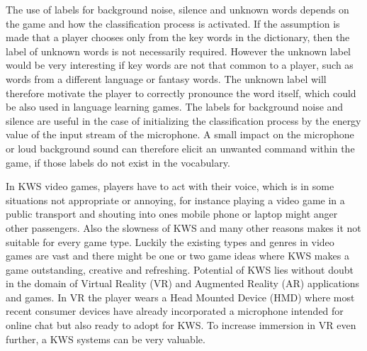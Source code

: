 The use of labels for background noise, silence and unknown words depends on the game and how the classification process is activated.
If the assumption is made that a player chooses only from the key words in the dictionary, then the label of unknown words is not necessarily required.
However the unknown label would be very interesting if key words are not that common to a player, such as words from a different language or fantasy words.
The unknown label will therefore motivate the player to correctly pronounce the word itself, which could be also used in language learning games.
The labels for background noise and silence are useful in the case of initializing the classification process by the energy value of the input stream of the microphone.
A small impact on the microphone or loud background sound can therefore elicit an unwanted command within the game, if those labels do not exist in the vocabulary.

In KWS video games, players have to act with their voice, which is in some situations not appropriate or annoying, for instance playing a video game in a public transport and shouting into ones mobile phone or laptop might anger other passengers.
Also the slowness of KWS and many other reasons makes it not suitable for every game type.
Luckily the existing types and genres in video games are vast and there might be one or two game ideas where KWS makes a game outstanding, creative and refreshing.
Potential of KWS lies without doubt in the domain of Virtual Reality (VR) and Augmented Reality (AR) applications and games.
In VR the player wears a Head Mounted Device (HMD) where most recent consumer devices have already incorporated a microphone intended for online chat but also ready to adopt for KWS.
To increase immersion in VR even further, a KWS systems can be very valuable.